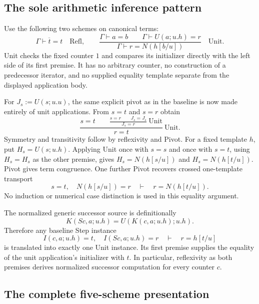 \subsection{The sole arithmetic inference pattern}

Use the following two schemes on canonical terms:
\[
 \overline{\Gamma\vdash t=t}\quad\mathrm{Refl},
 \qquad
 \frac{\Gamma\vdash a=b\qquad
       \Gamma\vdash U(a;u.h)=r}
      {\Gamma\vdash r=N(h[b/u])}\quad\mathrm{Unit}.
\]
Unit checks the fixed counter $1$ and compares its initializer directly
with the left side of its first premise.  It has no arbitrary counter,
no construction of a predecessor iterator, and no supplied equality
template separate from the displayed application body.

For $J_s:=U(s;u.u)$, the same explicit pivot as in the baseline is now
made entirely of unit applications.  From $s=t$ and $s=r$ obtain
\[
 \frac{s=t\qquad
       \displaystyle\frac{s=r\qquad J_s=J_s}{J_s=r}\ \mathrm{Unit}}
      {r=t}\ \mathrm{Unit}. \tag{Pivot}
\]
Symmetry and transitivity follow by reflexivity and Pivot.  For a fixed
template $h$, put $H_s=U(s;u.h)$.  Applying Unit once with $s=s$ and
once with $s=t$, using $H_s=H_s$ as the other premise, gives
$H_s=N(h[s/u])$ and $H_s=N(h[t/u])$.  Pivot gives term congruence.
One further Pivot recovers crossed one-template transport
\[
 s=t,\quad N(h[s/u])=r\quad\vdash\quad r=N(h[t/u]).
\]
No induction or numerical case distinction is used in this equality
argument.

The normalized generic successor source is definitionally
\[
 K(Sc,a;u.h)=U(K(c,a;u.h);u.h).
\]
Therefore any baseline Step instance
\[
 I(c,a;u.h)=t,\quad I(Sc,a;u.h)=r
       \quad\vdash\quad r=h[t/u]
\]
is translated into exactly one Unit instance.  Its first premise
supplies the equality of the unit application's initializer with $t$.
In particular, reflexivity as both premises derives normalized
successor computation for every counter $c$.

\subsection{The complete five-scheme presentation}

